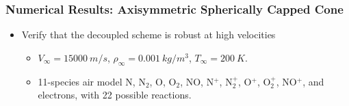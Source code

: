 \documentclass{beamer}
\begin{document}
\begin{frame}
  \frametitle{Numerical Results: Axisymmetric Spherically Capped Cone}
  \begin{figure}[h]
  	\centering
  \end{figure}
  \begin{itemize}
    \item Verify that the decoupled scheme is robust at high velocities
    \begin{itemize}
      \item $V_{\infty} = 15000\ m/s$, 
	$\rho_{\infty}=0.001\ kg/m^3$, $T_\infty = 200\ K$.
      \item 11-species air model N, $\text{N}_2$, O,
      $\text{O}_2$, NO, N$^+$, $\text{N}_2^+$, O$^+$, 
      $\text{O}_2^+$, NO$^+$, and electrons, with 22 possible reactions.
    \end{itemize}
  \end{itemize}
\end{frame}
\end{document}
